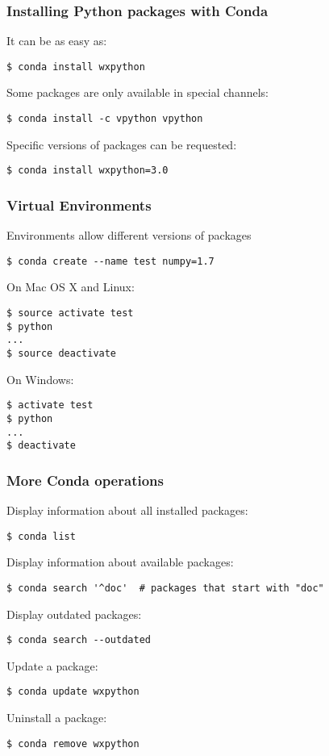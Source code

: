 \documentclass[10pt]{beamer}
\begin{document}
\begin{frame}[fragile]
\frametitle{Installing Python packages with Conda}
It can be as easy as:
\begin{verbatim}
$ conda install wxpython
\end{verbatim}
Some packages are only available in special channels:
\begin{verbatim}
$ conda install -c vpython vpython
\end{verbatim}
Specific versions of packages can be requested:
\begin{verbatim}
$ conda install wxpython=3.0
\end{verbatim}
\end{frame}

\begin{frame}[fragile]
\frametitle{Virtual Environments}
Environments allow different versions of packages
\begin{verbatim}
$ conda create --name test numpy=1.7
\end{verbatim}
On Mac OS X and Linux:
\begin{verbatim}
$ source activate test
$ python
...
$ source deactivate
\end{verbatim}
On Windows:
\begin{verbatim}
$ activate test
$ python
...
$ deactivate
\end{verbatim}
\end{frame}

\begin{frame}[fragile]
\frametitle{More Conda operations}
Display information about all installed packages:
\begin{verbatim}
$ conda list
\end{verbatim}
Display information about available packages:
\begin{verbatim}
$ conda search '^doc'  # packages that start with "doc"
\end{verbatim}
Display outdated packages:
\begin{verbatim}
$ conda search --outdated
\end{verbatim}
Update a package:
\begin{verbatim}
$ conda update wxpython
\end{verbatim}
Uninstall a package:
\begin{verbatim}
$ conda remove wxpython
\end{verbatim}
\end{frame}
\end{document}

